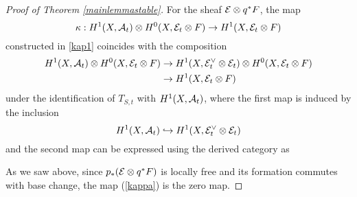 \documentclass[letterpaper,12pt]{amsart}
\theoremstyle{remark}
\begin{document}
\begin{proof}[Proof of Theorem \ref{mainlemmastable}]
For the sheaf $\mathcal{E} \otimes q^*F$, the map
\begin{equation}\label{kappa}
    \kappa: H^1(X, \mathcal{A}_t) \otimes H^0(X, \mathcal{E}_t \otimes F) \to H^1(X, \mathcal{E}_t \otimes F)
\end{equation}
constructed in \eqref{kap1} coincides with the composition
\begin{align*}
    H^1(X, \mathcal{A}_t) \otimes H^0(X, \mathcal{E}_t \otimes F) & \to H^1(X, \mathcal{E}_t^\vee \otimes \mathcal{E}_t) \otimes H^0(X, \mathcal{E}_t \otimes F) \\
    & \to H^1(X, \mathcal{E}_t \otimes F) 
\end{align*}
under the identification of $T_{S,t}$ with $H^1(X, \mathcal{A}_t)$, where the first map is induced by the inclusion 
\[ H^1(X, \mathcal{A}_t) \hookrightarrow H^1(X, \mathcal{E}_t^\vee \otimes \mathcal{E}_t) \] 
and the second map can be expressed using the derived category as
\begin{center}
\end{center}
As we saw above, since $p_*(\mathcal{E} \otimes q^*F)$ is locally free and its formation commutes with base change, the map (\ref{kappa}) is the zero map. 


\end{proof}
\end{document}
